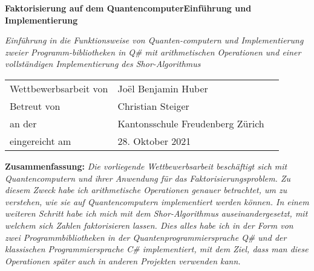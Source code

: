 \begin{titlepage}
    \centering
    {\begin{fullwidth}[leftmargin=-2cm, rightmargin=-2cm, width=\linewidth+4cm]
        \centering
        \huge \hspace{1cm} \textbf{Faktorisierung auf dem Quantencomputer\newline Einführung und Implementierung}
    \end{fullwidth}}
    \vspace{1cm}
    \begin{minipage}[c]{01\textwidth}
    {\LARGE\textit{Einführung in die Funktionsweise von Quanten-computern und Implementierung zweier Programm-bibliotheken in Q\# mit arithmetischen Operationen und einer vollständigen Implementierung des Shor-Algorithmus}}
    \end{minipage}
    \vspace{1cm}
    \newline
    {\Large \begin{tabular}{l@{}ll}
        Wettbewerbsarbeit von \; \; &  Joël Benjamin Huber & \\
        Betreut von & Christian Steiger & \\
        an der & Kantonsschule Freudenberg Zürich & \\
        eingereicht am & 28. Oktober 2021 & \\
    \end{tabular}
    }
    \vspace{3cm}
    \newline
    \begin{minipage}[c]{1\textwidth}
    {
        \textbf{Zusammenfassung: } \textit{Die vorliegende Wettbewerbsarbeit beschäftigt sich mit Quantencomputern und ihrer Anwendung für das Faktorisierungsproblem. Zu diesem Zweck habe ich arithmetische Operationen genauer betrachtet, um zu verstehen, wie sie auf Quantencomputern implementiert werden können. In einem weiteren Schritt habe ich mich mit dem Shor-Algorithmus auseinandergesetzt, mit welchem sich Zahlen faktorisieren lassen. Dies alles habe ich in der Form von zwei Programmbibliotheken in der Quantenprogrammiersprache Q\# und der klassischen Programmiersprache C\# implementiert, mit dem Ziel, dass man diese Operationen später auch in anderen Projekten verwenden kann. }
    }
    \end{minipage}
\end{titlepage}